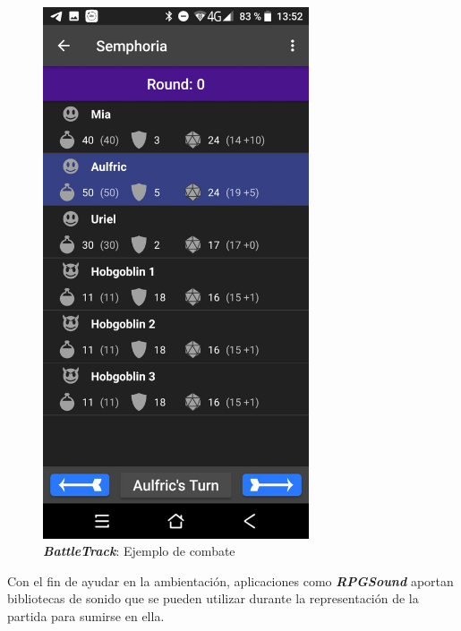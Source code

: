 \begin{figure}[H]
\begin{minipage}{0.3\textwidth}
    \end{minipage} \hspace{2cm}
    \begin{minipage}{0.3\textwidth}
        \centering
        \includegraphics[width=0.7\textwidth]{Images/BattleTrack_2.jpeg}
        \caption{\textit{\textbf{BattleTrack}}: Ejemplo de combate}
        
    \end{minipage}
\end{figure}
\vspace{1cm}


Con el fin de ayudar en la ambientación, aplicaciones como 
\textit{\textbf{RPGSound}} aportan bibliotecas de sonido que se pueden 
utilizar durante la representación de la partida para sumirse en ella.\vspace{1cm}


